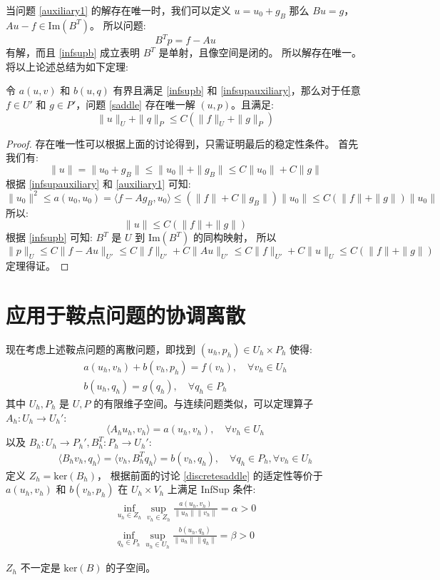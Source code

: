 \documentclass[lang=cn,a4paper,newtx]{elegantpaper}
\begin{document}
当问题 \eqref{auxiliary1} 的解存在唯一时，我们可以定义 $u = u_0 + g_B$
那么 $Bu = g$，$Au - f \in \mathrm{Im}(B^T)$。
所以问题:
$$
B^T p = f - Au
$$
有解，而且 \eqref{infsupb} 成立表明 $B^T$ 是单射，且像空间是闭的。
所以解存在唯一。将以上论述总结为如下定理:
\begin{theorem}
    令 $a(u, v)$ 和 $b(u, q)$ 有界且满足 \eqref{infsupb} 和
    \eqref{infsupauxiliary}，那么对于任意 $f\in U'$ 和
    $g\in P'$，问题 \eqref{saddle} 存在唯一解 $(u, p)$。且满足:
    $$
    \|u\|_U + \|q\|_P \leq C(\|f\|_U + \|g\|_P)
    $$
\end{theorem}
\begin{proof}
    存在唯一性可以根据上面的讨论得到，只需证明最后的稳定性条件。
    首先我们有:
    $$
    \|u\| = \|u_0 + g_B\| \leq \|u_0\| + \|g_B\| \leq C\|u_0\| + C\|g\|
    $$
    根据 \eqref{infsupauxiliary} 和 \eqref{auxiliary1} 可知:
    $$
    \|u_0\|^2 \leq a(u_0, u_0) = \langle f - Ag_B,  u_0\rangle \leq 
    (\|f\| + C\|g_B\|)\|u_0\| \leq C(\|f\| + \|g\|)\|u_0\|
    $$
    所以:
    $$
    \|u\| \leq C(\|f\| + \|g\|)
    $$
    根据 \eqref{infsupb} 可知:
    $B^T$ 是 $U$ 到 $\mathrm{Im}(B^T)$ 的同构映射，
    所以 
    $$
    \|p\|_{U} \leq C\|f - Au\|_{U'} \leq C\|f\|_{U'} + C\|Au\|_{U'}
    \leq C\|f\|_{U'} + C\|u\|_{U} \leq C(\|f\| + \|g\|)
    $$
    定理得证。
\end{proof}

\section{应用于鞍点问题的协调离散}
现在考虑上述鞍点问题的离散问题，即找到 $(u_h, p_h)\in U_h\times P_h$ 使得:
\begin{align}
\label{discretesaddle}
a(u_h, v_h) + b(v_h, p_h) = f(v_h), \quad \forall v_h \in U_h\\
b(u_h, q_h) = g(q_h), \quad \forall q_h \in P_h
\end{align}
其中 $U_h, P_h$ 是 $U, P$ 的有限维子空间。与连续问题类似，可以定理算子 $A_h: U_h \to U_h'$:
$$
\langle A_h u_h,  v_h\rangle = a(u_h, v_h), \quad \forall v_h \in U_h
$$
以及 $B_h: U_h \to P_h', B_h^T: P_h \to U_h'$:
$$
\begin{aligned}
\langle B_h v_h,  q_h\rangle = \langle v_h,  B_h^T q_h\rangle = b(v_h, q_h), \quad \forall q_h \in
P_h, \forall v_h \in U_h
\end{aligned}
$$
定义 $Z_h = \mathrm{ker}(B_h)$，
根据前面的讨论 \eqref{discretesaddle}
的适定性等价于 $a(u_h, v_h)$ 和 $b(v_h, p_h)$ 在 $U_h\times V_h$ 上满足 InfSup 条件:
\begin{align}
\label{infsupdiscretesaddle}
\inf_{u_h\in Z_h}\sup_{v_h\in Z_h}\frac{a(u_h, v_h)}{\|u_h\|\|v_h\|} = \alpha > 0\\
\inf_{q_h\in P_h}\sup_{u_h\in U_h}\frac{b(u_h, q_h)}{\|u_h\|\|q_h\|} = \beta > 0
\end{align}
\begin{note}
    $Z_h$ 不一定是 $\mathrm{ker}(B)$ 的子空间。
\end{note}
\end{document}
